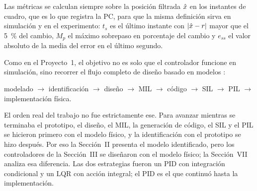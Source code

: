 Las métricas se calculan siempre sobre la posición filtrada $\hat{x}$ en los instantes de cuadro,
que es lo que registra la PC, para que la misma definición sirva en simulación y en el
experimento: $t_s$ es el último instante con $|\hat{x} - r|$ mayor que el \SI{5}{\percent} del
cambio, $M_p$ el máximo sobrepaso en porcentaje del cambio y $e_{ss}$ el valor absoluto de la
media del error en el último segundo.

Como en el Proyecto~1, el objetivo no es solo que el controlador funcione en simulación, sino
recorrer el flujo completo de diseño basado en modelos \cite{mw_hil}:

\begin{center}
modelado $\rightarrow$ identificación $\rightarrow$ diseño $\rightarrow$ MIL $\rightarrow$
código $\rightarrow$ SIL $\rightarrow$ PIL $\rightarrow$ implementación física.
\end{center}

El orden real del trabajo no fue estrictamente ese. Para avanzar mientras se terminaba el
prototipo, el diseño, el MIL, la generación de código, el SIL y el PIL se hicieron primero con el
modelo físico, y la identificación con el prototipo se hizo después. Por eso la
Sección~II presenta el modelo identificado, pero los controladores de la Sección~III se
diseñaron con el modelo físico; la Sección~VII analiza esa diferencia. Las dos estrategias fueron
un PID con integración condicional y un LQR con acción integral; el PID es el que continuó hasta
la implementación.
